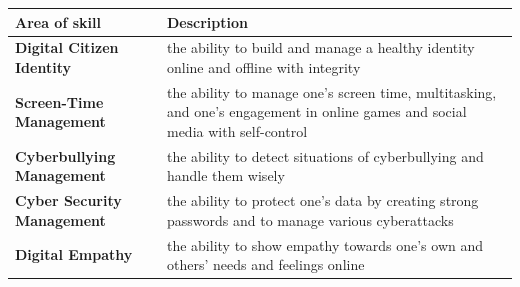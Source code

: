 \documentclass[]{book}
\begin{document}
\begin{longtable}[]{@{}ll@{}}
\toprule
\begin{minipage}[b]{0.28\columnwidth}\raggedright
Area of skill\strut
\end{minipage} & \begin{minipage}[b]{0.67\columnwidth}\raggedright
Description\strut
\end{minipage}\tabularnewline
\midrule
\endhead
\begin{minipage}[t]{0.28\columnwidth}\raggedright
\textbf{Digital Citizen Identity}\strut
\end{minipage} & \begin{minipage}[t]{0.67\columnwidth}\raggedright
the ability to build and manage a healthy identity online and offline with integrity\strut
\end{minipage}\tabularnewline
\begin{minipage}[t]{0.28\columnwidth}\raggedright
\textbf{Screen-Time Management}\strut
\end{minipage} & \begin{minipage}[t]{0.67\columnwidth}\raggedright
the ability to manage one's screen time, multitasking, and one's engagement in online games and social media with self-control\strut
\end{minipage}\tabularnewline
\begin{minipage}[t]{0.28\columnwidth}\raggedright
\textbf{Cyberbullying Management}\strut
\end{minipage} & \begin{minipage}[t]{0.67\columnwidth}\raggedright
the ability to detect situations of cyberbullying and handle them wisely\strut
\end{minipage}\tabularnewline
\begin{minipage}[t]{0.28\columnwidth}\raggedright
\textbf{Cyber Security Management}\strut
\end{minipage} & \begin{minipage}[t]{0.67\columnwidth}\raggedright
the ability to protect one's data by creating strong passwords and to manage various cyberattacks\strut
\end{minipage}\tabularnewline
\begin{minipage}[t]{0.28\columnwidth}\raggedright
\textbf{Digital Empathy}\strut
\end{minipage} & \begin{minipage}[t]{0.67\columnwidth}\raggedright
the ability to show empathy towards one's own and others' needs and feelings online\strut
\end{minipage}\tabularnewline

\end{longtable}
\end{document}
